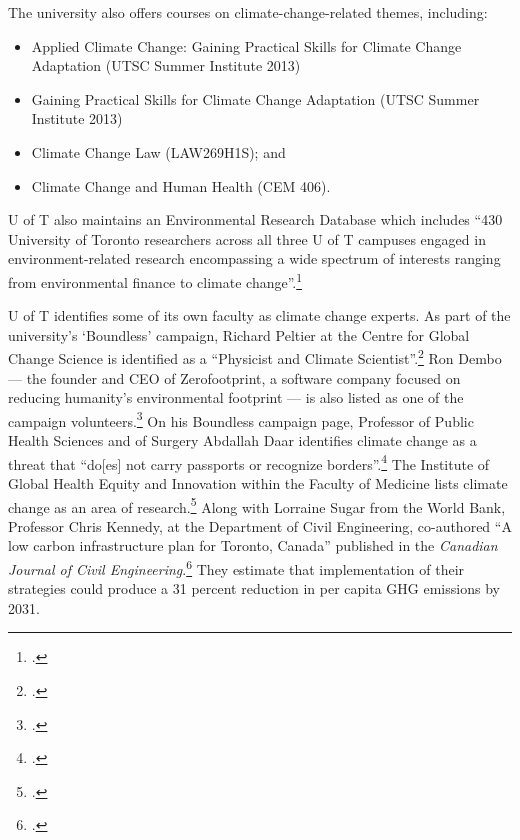 \documentclass[10pt]{article}
\begin{document}
The university also offers courses on climate-change-related themes, including:
\begin{itemize}
	\item Applied Climate Change: Gaining Practical Skills for Climate Change Adaptation (UTSC Summer Institute 2013)
	\item Gaining Practical Skills for Climate Change Adaptation (UTSC Summer Institute 2013)
	\item Climate Change Law (LAW269H1S); and
	\item Climate Change and Human Health (CEM 406).
\end{itemize}
U of T also maintains an Environmental Research Database which includes ``430 University of Toronto researchers across all three U of T campuses engaged in environment-related research encompassing a wide spectrum of interests ranging from environmental finance to climate change''.\footcite[][]{UTEnvResDB}






U of T identifies some of its own faculty as climate change experts.
As part of the university's `Boundless' campaign, Richard Peltier at the Centre for Global Change Science is identified as a ``Physicist and Climate Scientist''.\footcite[][]{PeltierBoundless}
Ron Dembo --- the founder and CEO of Zerofootprint, a software company focused on reducing humanity's environmental footprint --- is also listed as one of the campaign volunteers.\footcite[][]{DemboBoundless}
On his Boundless campaign page, Professor of Public Health Sciences and of Surgery Abdallah Daar identifies climate change as a threat that ``do[es] not carry passports or recognize borders''.\footcite[][]{DaarBoundless}
The Institute of Global Health Equity and Innovation within the Faculty of Medicine lists climate change as an area of research.\footcite[][]{GlobalHealthEquity}
Along with Lorraine Sugar from the World Bank, Professor Chris Kennedy, at the Department of Civil Engineering, co-authored ``A low carbon infrastructure plan for Toronto, Canada'' published in the \emph{Canadian Journal of Civil Engineering}.\footcite[][p. 86-96]{Sugar2012}
They estimate that implementation of their strategies could produce a 31 percent reduction in per capita GHG emissions by 2031.
\end{document}
